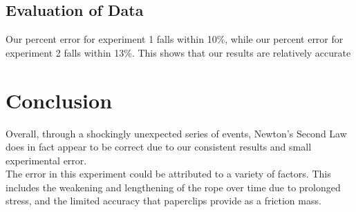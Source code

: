 \documentclass[12pt]{article}
\begin{document}
        \subsection{Evaluation of Data}
           Our percent error for experiment 1 falls within 10\%,
           while our percent error for experiment 2 falls within 13\%.
           This shows that our results are relatively accurate
    \section{Conclusion}
        Overall, through a shockingly unexpected series of events,
        Newton's Second Law does in fact appear to be correct due to
        our consistent results and small experimental error. \\
        The error in this experiment could be attributed to a variety of
        factors. This includes the weakening and lengthening of the rope 
        over time due to prolonged stress, and the limited accuracy
        that paperclips provide as a friction mass.
        
\end{document}
